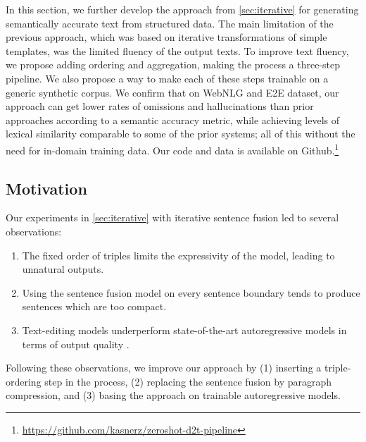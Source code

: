 In this section, we further develop the approach from \autoref{sec:iterative} for generating semantically accurate text from structured data. The main limitation of the previous approach, which was based on iterative transformations of simple templates, was the limited fluency of the output texts. To improve text fluency, we propose adding ordering and aggregation, making the process a three-step pipeline. We also propose a way to make each of these steps trainable on a generic synthetic corpus. We confirm that on WebNLG and E2E dataset, our approach can get lower rates of omissions and hallucinations than prior approaches according to a semantic accuracy metric, while achieving levels of lexical similarity comparable to some of the prior systems; all of this without the need for in-domain training data. Our code and data is available on Github.\footnote{\url{https://github.com/kasnerz/zeroshot-d2t-pipeline}}


\subsection{Motivation}
Our experiments in \autoref{sec:iterative} with iterative sentence fusion led to several observations:

\begin{enumerate}
    \item The fixed order of triples limits the expressivity of the model, leading to unnatural outputs.
    \item Using the sentence fusion model on every sentence boundary tends to produce sentences which are too compact.
    \item Text-editing models underperform state-of-the-art autoregressive models in terms of output quality \cite{kaleTexttoTextPreTrainingDatatoText2020,ribeiroInvestigatingPretrainedLanguage2020}.
\end{enumerate}

Following these observations, we improve our approach by (1) inserting a triple-ordering step in the process, (2) replacing the sentence fusion by paragraph compression, and (3) basing the approach on trainable autoregressive models.


